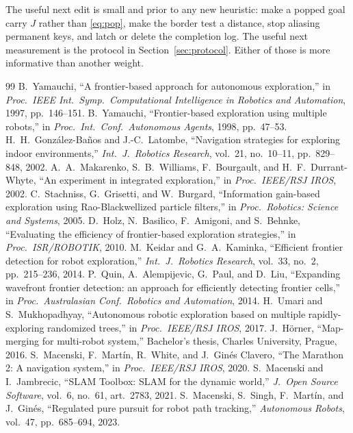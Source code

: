 \documentclass[11pt]{article}
\begin{document}
The useful next edit is small and prior to any new heuristic: make a popped goal carry $J$ rather than \eqref{eq:pop}, make the border test a distance, stop aliasing permanent keys, and latch or delete the completion log. The useful next measurement is the protocol in Section~\ref{sec:protocol}. Either of those is more informative than another weight.

\begin{thebibliography}{99}
 B.~Yamauchi, ``A frontier-based approach for autonomous exploration,'' in \emph{Proc.\ IEEE Int.\ Symp.\ Computational Intelligence in Robotics and Automation}, 1997, pp.~146--151.
 B.~Yamauchi, ``Frontier-based exploration using multiple robots,'' in \emph{Proc.\ Int.\ Conf.\ Autonomous Agents}, 1998, pp.~47--53.
 H.~H.~Gonz\'alez-Ba\~nos and J.-C.~Latombe, ``Navigation strategies for exploring indoor environments,'' \emph{Int.\ J.\ Robotics Research}, vol.~21, no.~10--11, pp.~829--848, 2002.
 A.~A.~Makarenko, S.~B.~Williams, F.~Bourgault, and H.~F.~Durrant-Whyte, ``An experiment in integrated exploration,'' in \emph{Proc.\ IEEE/RSJ IROS}, 2002.
 C.~Stachniss, G.~Grisetti, and W.~Burgard, ``Information gain-based exploration using Rao-Blackwellized particle filters,'' in \emph{Proc.\ Robotics: Science and Systems}, 2005.
 D.~Holz, N.~Basilico, F.~Amigoni, and S.~Behnke, ``Evaluating the efficiency of frontier-based exploration strategies,'' in \emph{Proc.\ ISR/ROBOTIK}, 2010.
 M.~Keidar and G.~A.~Kaminka, ``Efficient frontier detection for robot exploration,'' \emph{Int.\ J.\ Robotics Research}, vol.~33, no.~2, pp.~215--236, 2014.
 P.~Quin, A.~Alempijevic, G.~Paul, and D.~Liu, ``Expanding wavefront frontier detection: an approach for efficiently detecting frontier cells,'' in \emph{Proc.\ Australasian Conf.\ Robotics and Automation}, 2014.
 H.~Umari and S.~Mukhopadhyay, ``Autonomous robotic exploration based on multiple rapidly-exploring randomized trees,'' in \emph{Proc.\ IEEE/RSJ IROS}, 2017.
 J.~H\"orner, ``Map-merging for multi-robot system,'' Bachelor's thesis, Charles University, Prague, 2016.
 S.~Macenski, F.~Mart\'in, R.~White, and J.~Gin\'es Clavero, ``The Marathon 2: A navigation system,'' in \emph{Proc.\ IEEE/RSJ IROS}, 2020.
 S.~Macenski and I.~Jambrecic, ``SLAM Toolbox: SLAM for the dynamic world,'' \emph{J.\ Open Source Software}, vol.~6, no.~61, art.~2783, 2021.
 S.~Macenski, S.~Singh, F.~Mart\'in, and J.~Gin\'es, ``Regulated pure pursuit for robot path tracking,'' \emph{Autonomous Robots}, vol.~47, pp.~685--694, 2023.
\end{thebibliography}
\end{document}
